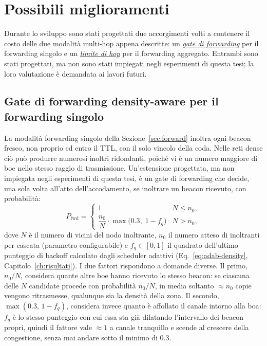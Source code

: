 \section{Possibili miglioramenti}
\label{sec:improvements}
Durante lo sviluppo sono stati progettati due accorgimenti volti a contenere il costo
delle due modalit\`a multi-hop appena descritte: un \hyperref[sec:fwdgate]{\emph{gate di forwarding}} 
per il forwarding singolo e un \hyperref[sec:append-hoplimit]{\emph{limite di hop}} per il forwarding aggregato. 
Entrambi sono stati progettati, ma non sono stati impiegati negli esperimenti di questa tesi; la
loro valutazione \`e demandata ai lavori futuri.

\subsection{Gate di forwarding density-aware per il forwarding singolo}
\label{sec:fwdgate}
La modalit\`a forwarding singolo della Sezione~\ref{sec:forward} inoltra ogni beacon fresco,
non proprio ed entro il TTL, con il solo vincolo della coda. Nelle reti dense ci\`o pu\`o
produrre numerosi inoltri ridondanti, poich\'e vi \`e un numero maggiore di boe nello stesso raggio di
trasmissione. Un'estensione progettata, ma non impiegata
negli esperimenti di questa tesi, \`e un gate di forwarding che decide, una
sola volta all'atto dell'accodamento, se inoltrare un beacon ricevuto, con
probabilit\`a:
\begin{equation}
  P_{\text{fwd}} =
  \begin{cases}
    1 & N \le n_0,\\[2pt]
    \dfrac{n_0}{N}\cdot \max\!\big(0.3,\;1-f_q\big) & N > n_0,
  \end{cases}
  \label{eq:fwdgate}
\end{equation}
dove $N$ \`e il numero di vicini del nodo inoltrante, $n_0$ il numero atteso di
inoltranti per cascata (parametro configurabile) e $f_q \in [0,1]$ il quadrato
dell'ultimo punteggio di backoff calcolato dagli scheduler adattivi
(Eq.~\ref{eq:adab-density}, Capitolo~\ref{ch:risultati}). I due fattori rispondono a
domande diverse. Il primo, $n_0/N$, considera quante altre boe hanno ricevuto lo stesso
beacon: se ciascuna delle $N$ candidate procede con probabilit\`a $n_0/N$, in media
soltanto $\approx n_0$ copie vengono ritrasmesse, qualunque sia la densit\`a della zona.
Il secondo, $\max(0.3,\,1-f_q)$, considera invece quanto \`e affollato il canale
intorno alla boa: $f_q$ \`e lo stesso punteggio con cui essa sta gi\`a dilatando
l'intervallo dei beacon propri, quindi il fattore vale $\approx 1$ a canale tranquillo e
scende al crescere della congestione, senza mai andare sotto il minimo di $0.3$.

